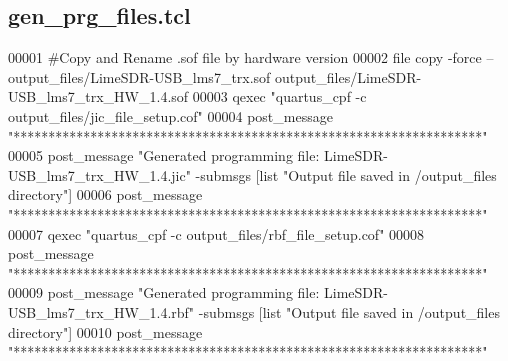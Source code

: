 \subsection{gen\+\_\+prg\+\_\+files.\+tcl}
\label{gen__prg__files_8tcl_source}

\begin{DoxyCode}
00001 \textcolor{comment}{#Copy and Rename .sof file by hardware version }
00002 \textcolor{comment}{}\textcolor{keyword}{file} copy -force -- output\_files/LimeSDR-USB\_lms7\_trx.sof output\_files/LimeSDR-USB\_lms7\_trx\_HW\_1.4.sof\textcolor{comment}{}
00003 \textcolor{comment}{}qexec "quartus\_cpf -c output\_files/jic\_file\_setup.cof"\textcolor{comment}{}
00004 \textcolor{comment}{}post\_message "*******************************************************************"\textcolor{comment}{}
00005 \textcolor{comment}{}post\_message "Generated programming file: LimeSDR-USB\_lms7\_trx\_HW\_1.4.jic" -submsgs [list "Output file
       saved in /output\_files directory"]\textcolor{comment}{}
00006 \textcolor{comment}{}post\_message "*******************************************************************"\textcolor{comment}{}
00007 \textcolor{comment}{}qexec "quartus\_cpf -c output\_files/rbf\_file\_setup.cof"\textcolor{comment}{}
00008 \textcolor{comment}{}post\_message "*******************************************************************"\textcolor{comment}{}
00009 \textcolor{comment}{}post\_message "Generated programming file: LimeSDR-USB\_lms7\_trx\_HW\_1.4.rbf" -submsgs [list "Output file
       saved in /output\_files directory"]\textcolor{comment}{}
00010 \textcolor{comment}{}post\_message "*******************************************************************"
\end{DoxyCode}
